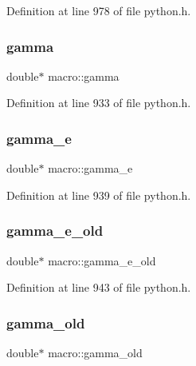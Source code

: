 Definition at line 978 of file python.\+h.

\mbox{\label{structmacro_acc6db9c38b22c6e664567d2a46b9b3aa}} 
\subsubsection{\texorpdfstring{gamma}{gamma}}
{\footnotesize\ttfamily double$\ast$ macro\+::gamma}



Definition at line 933 of file python.\+h.

\mbox{\label{structmacro_a594afc421f440fb2cab4b3a8ef59f582}} 
\subsubsection{\texorpdfstring{gamma\+\_\+e}{gamma\_e}}
{\footnotesize\ttfamily double$\ast$ macro\+::gamma\+\_\+e}



Definition at line 939 of file python.\+h.

\mbox{\label{structmacro_a748f4ad8b68b49d60c73644b4882ab70}} 
\subsubsection{\texorpdfstring{gamma\+\_\+e\+\_\+old}{gamma\_e\_old}}
{\footnotesize\ttfamily double$\ast$ macro\+::gamma\+\_\+e\+\_\+old}



Definition at line 943 of file python.\+h.

\mbox{\label{structmacro_ae6d7a0a034aa6e4b67b5a379fc599b4d}} 
\subsubsection{\texorpdfstring{gamma\+\_\+old}{gamma\_old}}
{\footnotesize\ttfamily double$\ast$ macro\+::gamma\+\_\+old}



